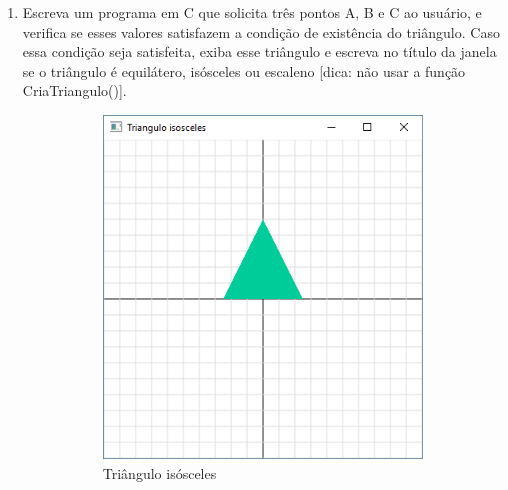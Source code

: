 \begin{enumerate}
\begin{figure}[h!]
\end{figure}

\item

Escreva um programa em C que solicita três pontos A, B e C ao usuário, e verifica se esses valores satisfazem a condição de existência do triângulo. Caso essa condição seja satisfeita, exiba esse triângulo e escreva no título da janela se o triângulo é equilátero, isósceles ou escaleno [dica: não usar a função CriaTriangulo()].

  \begin{figure}[h!]
    \centering
    \begin{subfigure}[b]{0.3\textwidth}
        \centerline{\includegraphics[width=.9\textwidth]{img/cap1_ex23}}
        \caption{Triângulo isósceles}
        \label{fig:cap01_ex23a}
    \end{subfigure}
    ~
    \begin{subfigure}[b]{0.3\textwidth}

\end{subfigure}
\end{figure}
\end{enumerate}
